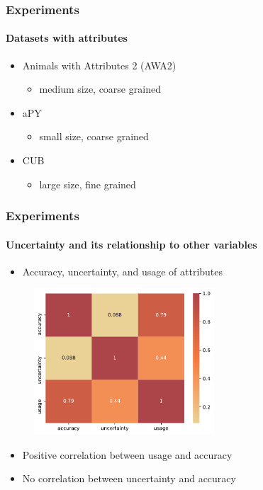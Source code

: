 \documentclass[9pt]{beamer}
\begin{document}
\begin{frame}
\frametitle{Experiments}
\framesubtitle{Datasets with attributes}
\begin{itemize}
	\item Animals with Attributes 2 (AWA2)
	\begin{itemize}
		\item medium size, coarse grained
	\end{itemize}
	\item aPY
	\begin{itemize}
		\item small size, coarse grained
	\end{itemize}	
	\item CUB
	\begin{itemize}
		\item large size, fine grained
	\end{itemize}
\end{itemize}
\end{frame}



\begin{frame}	
\frametitle{Experiments}
\framesubtitle{Uncertainty and its relationship to other variables}
\begin{itemize}
	\item Accuracy, uncertainty, and usage of attributes
\end{itemize} 
	\begin{figure}
		\centering
		\includegraphics[width=0.6\textwidth]{images/corr_matrix.pdf}
	\end{figure}
	\begin{itemize}
		\item Positive correlation between usage and accuracy
		\item No correlation between uncertainty and accuracy
	\end{itemize}
\end{frame}
\end{document}
